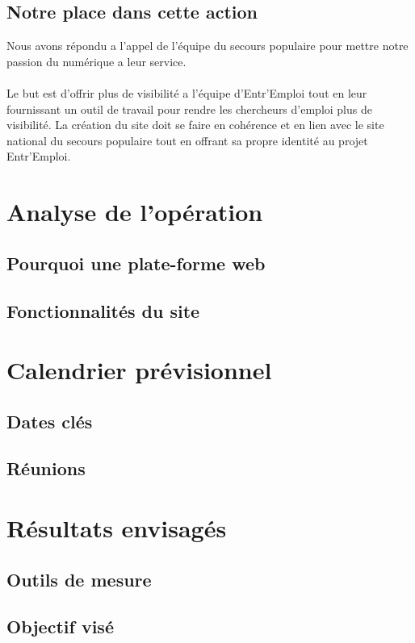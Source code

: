 \documentclass[12pt]{report}
\begin{document}
\section{Notre place dans cette action}
Nous avons répondu a l'appel de l'équipe du secours populaire pour mettre notre passion du numérique a leur service.\\
\\
Le but est d'offrir plus de visibilité a l'équipe d'Entr'Emploi tout en leur fournissant un outil de travail pour rendre les chercheurs d'emploi plus de visibilité. 
La création du site doit se faire en cohérence et en lien avec le site national du secours populaire tout en offrant sa propre identité au projet Entr'Emploi.\\

\chapter{Analyse de l’opération}
\section{Pourquoi une plate-forme web}
\section{Fonctionnalités du site}

\chapter{Calendrier prévisionnel}
\section{Dates clés}
\section{Réunions}

\chapter{Résultats envisagés}
\section{Outils de mesure}
\section{Objectif visé}
\end{document}
